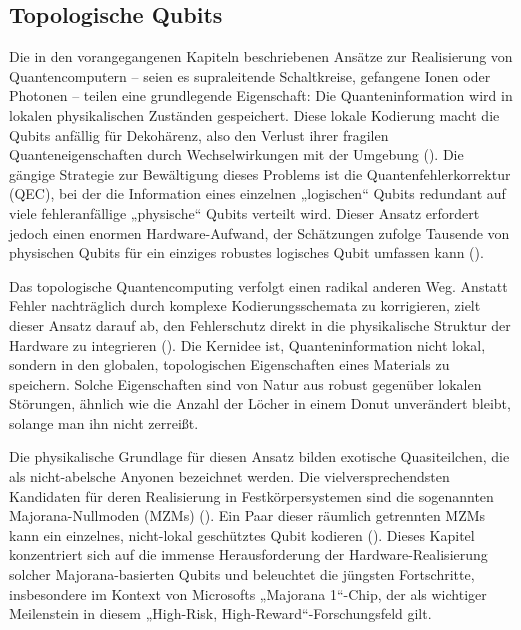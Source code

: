 \subsection{Topologische Qubits}
Die in den vorangegangenen Kapiteln beschriebenen Ansätze zur Realisierung von Quantencomputern – seien es supraleitende Schaltkreise, gefangene Ionen oder Photonen – teilen eine grundlegende Eigenschaft: Die Quanteninformation wird in lokalen physikalischen Zuständen gespeichert. Diese lokale Kodierung macht die Qubits anfällig für Dekohärenz, also den Verlust ihrer fragilen Quanteneigenschaften durch Wechselwirkungen mit der Umgebung (\cite{bolgarMicrosoftsMajorana1}). Die gängige Strategie zur Bewältigung dieses Problems ist die Quantenfehlerkorrektur (QEC), bei der die Information eines einzelnen „logischen“ Qubits redundant auf viele fehleranfällige „physische“ Qubits verteilt wird. Dieser Ansatz erfordert jedoch einen enormen Hardware-Aufwand, der Schätzungen zufolge Tausende von physischen Qubits für ein einziges robustes logisches Qubit umfassen kann (\cite{PDFMicrosoftsMajorana2025}).

Das topologische Quantencomputing verfolgt einen radikal anderen Weg. Anstatt Fehler nachträglich durch komplexe Kodierungsschemata zu korrigieren, zielt dieser Ansatz darauf ab, den Fehlerschutz direkt in die physikalische Struktur der Hardware zu integrieren (\cite{lutchynRealizingMajoranaZero2017}). Die Kernidee ist, Quanteninformation nicht lokal, sondern in den globalen, topologischen Eigenschaften eines Materials zu speichern. Solche Eigenschaften sind von Natur aus robust gegenüber lokalen Störungen, ähnlich wie die Anzahl der Löcher in einem Donut unverändert bleibt, solange man ihn nicht zerreißt.

Die physikalische Grundlage für diesen Ansatz bilden exotische Quasiteilchen, die als nicht-abelsche Anyonen bezeichnet werden. Die vielversprechendsten Kandidaten für deren Realisierung in Festkörpersystemen sind die sogenannten Majorana-Nullmoden (MZMs) (\cite{dougfinkeDeeperDiveMicrosofts2023}). Ein Paar dieser räumlich getrennten MZMs kann ein einzelnes, nicht-lokal geschütztes Qubit kodieren (\cite{lutchynRealizingMajoranaZero2017}). Dieses Kapitel konzentriert sich auf die immense Herausforderung der Hardware-Realisierung solcher Majorana-basierten Qubits und beleuchtet die jüngsten Fortschritte, insbesondere im Kontext von Microsofts „Majorana 1“-Chip, der als wichtiger Meilenstein in diesem „High-Risk, High-Reward“-Forschungsfeld gilt.

